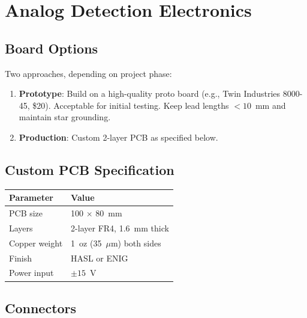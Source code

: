 \documentclass[11pt,a4paper,openany]{book}
\begin{document}
\chapter{Analog Detection Electronics}\label{ch:analog}


\section{Board Options}

Two approaches, depending on project phase:

\begin{enumerate}[nosep]
  \item \textbf{Prototype}: Build on a high-quality proto board (e.g., Twin Industries 8000-45, \$20). Acceptable for initial testing. Keep lead lengths $< 10$~mm and maintain star grounding.
  \item \textbf{Production}: Custom 2-layer PCB as specified below.
\end{enumerate}

\section{Custom PCB Specification}

\begin{center}
\begin{tabular}{ll}
\toprule
\textbf{Parameter} & \textbf{Value} \\
\midrule
PCB size & 100 $\times$ 80~mm \\
Layers & 2-layer FR4, 1.6~mm thick \\
Copper weight & 1~oz (35~$\mu$m) both sides \\
Finish & HASL or ENIG \\
Power input & $\pm 15$~V \\
\bottomrule
\end{tabular}
\end{center}

\section{Connectors}
\end{document}
